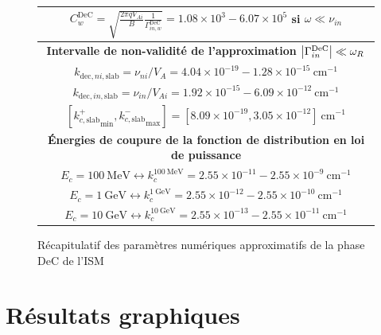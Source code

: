 \documentclass[10pt,a4paper]{article}
\begin{document}
\begin{figure}[h]
\begin{tabular}{|c|}
$C^\mathrm{DeC}_w = \sqrt{\frac{2\pi qV_{Ai}}{B} \frac{1}{\Gamma^\mathrm{DeC}_{in,w}}} = 1.08\times 10^3 - 6.07 \times 10^5$ si $\omega \ll \nu_{in}$ \\ 
\hline 
\hline
\bf{Intervalle de non-validité de l'approximation $\abs{\Gamma^\mathrm{DeC}_{in}} \ll \omega_R$} \\ 
\hline
$k_{\mathrm{dec},ni,\mathrm{slab}} = \nu_{ni}/V_A = 4.04\times 10^{-19} - 1.28 \times 10^{-15} ~ \mathrm{cm}^{-1}$ \\ 
$k_{\mathrm{dec},in,\mathrm{slab}} = \nu_{in}/V_{Ai} = 1.92\times 10^{-15} - 6.09 \times 10^{-12} ~ \mathrm{cm}^{-1}$ \\ 
$\left[{k^+_{c,\mathrm{slab}}}_\mathrm{min}, {k^-_{c,\mathrm{slab}}}_\mathrm{max} \right] = [8.09 \times 10^{-19}, 3.05\times 10^{-12}] ~ \mathrm{cm}^{-1}$ \\ 
\hline
\hline
\bf{Énergies de coupure de la fonction de distribution en loi de puissance} \\ 
\hline
$E_c = 100~\mathrm{MeV} \leftrightarrow k^{100~\mathrm{MeV}}_c = 2.55\times 10^{-11} - 2.55 \times 10^{-9}~\mathrm{cm}^{-1}$ \\ 
$E_c = 1~\mathrm{GeV} \leftrightarrow k^{1~\mathrm{GeV}}_c = 2.55\times 10^{-12} - 2.55 \times 10^{-10} ~\mathrm{cm}^{-1}$     \\ 
$E_c = 10~\mathrm{GeV} \leftrightarrow k^{10~\mathrm{GeV}}_c = 2.55\times 10^{-13} - 2.55 \times 10^{-11}~\mathrm{cm}^{-1}$   \\ 
\hline

\end{tabular}
\caption{Récapitulatif des paramètres numériques approximatifs de la phase DeC de l'ISM} 
\end{figure}

\section{Résultats graphiques}
\end{document}
